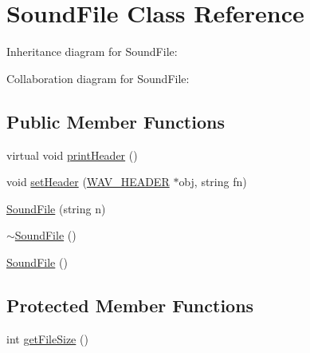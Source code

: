 \hypertarget{classSoundFile}{}\section{Sound\+File Class Reference}
\label{classSoundFile}


Inheritance diagram for Sound\+File\+:


Collaboration diagram for Sound\+File\+:
\subsection*{Public Member Functions}
\begin{DoxyCompactItemize}
\item 
virtual void \hyperlink{classSoundFile_a44b17fb295a9918410c7ec4242370ef9}{print\+Header} ()
\item 
void \hyperlink{classSoundFile_ab867a2098653a80f9eb89d39b4ad3f03}{set\+Header} (\hyperlink{structWAV__HEADER}{W\+A\+V\+\_\+\+H\+E\+A\+D\+ER} $\ast$obj, string fn)
\item 
\hyperlink{classSoundFile_ad51984b0112e70cae3158b17ab2e3466}{Sound\+File} (string n)
\item 
\hyperlink{classSoundFile_a2a4cc3a7780cc699e1ef51fc98f5d846}{$\sim$\+Sound\+File} ()
\item 
\hyperlink{classSoundFile_a6b4a3ffaf85f0f60b8c311185ea8bd58}{Sound\+File} ()
\end{DoxyCompactItemize}
\subsection*{Protected Member Functions}
\begin{DoxyCompactItemize}
\item 
int \hyperlink{classSoundFile_a0455dae80379afda92f2900a74b4f44a}{get\+File\+Size} ()
\end{DoxyCompactItemize}
